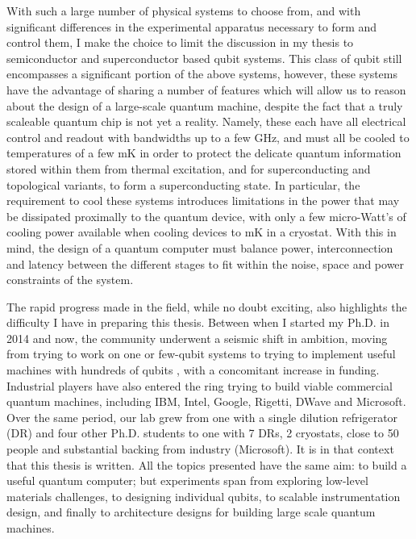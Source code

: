 With such a large number of physical systems to choose from, and with significant differences in the experimental
apparatus necessary to form and control them, I make the choice to limit the discussion in my thesis to semiconductor and superconductor
based qubit systems. This class of qubit still encompasses a significant portion of the above systems, however, these systems
have the advantage of sharing a number of features which will allow us to reason about the design of a large-scale quantum machine,
despite the fact that a truly scaleable quantum chip is not yet a reality. Namely, these each have all electrical control and
readout with bandwidths up to a few \si{\giga\hertz}, and must all be cooled to temperatures of a few mK in order to protect the delicate
quantum information stored within them from thermal excitation, and for superconducting and topological variants, to form a superconducting
state. In particular, the requirement to cool these systems introduces limitations in the power that may be dissipated proximally to the quantum device,
with only a few micro-Watt's of cooling power available when cooling devices to \si{\milli\kelvin} in a cryostat. With this in mind,
the design of a quantum computer must balance power, interconnection and latency between the different stages to fit within the noise,
space and power constraints of the system.

The rapid progress made in the field, while no doubt exciting, also highlights the difficulty I have in
preparing this thesis. Between when I started my Ph.D. in 2014 and now, the community underwent a seismic
shift in ambition, moving from trying to work on one or few-qubit systems \cite{iarpa_mqco} to trying
to implement useful machines with hundreds of qubits \cite{Monroe440}, with a concomitant increase in
funding. Industrial players have also entered the ring trying to build viable commercial quantum machines,
including IBM, Intel, Google, Rigetti, DWave and Microsoft. Over the same period, our lab grew from one with a
single dilution refrigerator (DR) and four other Ph.D. students to one with 7 DRs, 2 cryostats, close to 50 people
and substantial backing from industry (Microsoft). It is in that context that this thesis is written. All the topics
presented have the same aim: to build a useful quantum computer; but experiments span from exploring low-level materials
challenges, to designing individual qubits, to scalable instrumentation design, and finally to architecture
designs for building large scale quantum machines.

